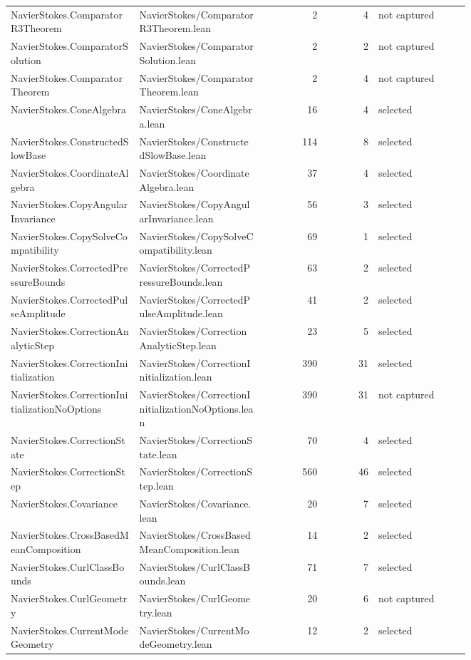 \documentclass[10pt]{article}
\begin{document}
\begin{longtable}{p{0.28\linewidth}p{0.27\linewidth}r r p{0.20\linewidth}}
NavierStokes.ComparatorR3Theorem & NavierStokes/ComparatorR3Theorem.lean & 2 & 4 & not captured\\
NavierStokes.ComparatorSolution & NavierStokes/ComparatorSolution.lean & 2 & 2 & not captured\\
NavierStokes.ComparatorTheorem & NavierStokes/ComparatorTheorem.lean & 2 & 4 & not captured\\
NavierStokes.ConeAlgebra & NavierStokes/ConeAlgebra.lean & 16 & 4 & selected\\
NavierStokes.ConstructedSlowBase & NavierStokes/ConstructedSlowBase.lean & 114 & 8 & selected\\
NavierStokes.CoordinateAlgebra & NavierStokes/CoordinateAlgebra.lean & 37 & 4 & selected\\
NavierStokes.CopyAngularInvariance & NavierStokes/CopyAngularInvariance.lean & 56 & 3 & selected\\
NavierStokes.CopySolveCompatibility & NavierStokes/CopySolveCompatibility.lean & 69 & 1 & selected\\
NavierStokes.CorrectedPressureBounds & NavierStokes/CorrectedPressureBounds.lean & 63 & 2 & selected\\
NavierStokes.CorrectedPulseAmplitude & NavierStokes/CorrectedPulseAmplitude.lean & 41 & 2 & selected\\
NavierStokes.CorrectionAnalyticStep & NavierStokes/CorrectionAnalyticStep.lean & 23 & 5 & selected\\
NavierStokes.CorrectionInitialization & NavierStokes/CorrectionInitialization.lean & 390 & 31 & selected\\
NavierStokes.CorrectionInitializationNoOptions & NavierStokes/CorrectionInitializationNoOptions.lean & 390 & 31 & not captured\\
NavierStokes.CorrectionState & NavierStokes/CorrectionState.lean & 70 & 4 & selected\\
NavierStokes.CorrectionStep & NavierStokes/CorrectionStep.lean & 560 & 46 & selected\\
NavierStokes.Covariance & NavierStokes/Covariance.lean & 20 & 7 & selected\\
NavierStokes.CrossBasedMeanComposition & NavierStokes/CrossBasedMeanComposition.lean & 14 & 2 & selected\\
NavierStokes.CurlClassBounds & NavierStokes/CurlClassBounds.lean & 71 & 7 & selected\\
NavierStokes.CurlGeometry & NavierStokes/CurlGeometry.lean & 20 & 6 & not captured\\
NavierStokes.CurrentModeGeometry & NavierStokes/CurrentModeGeometry.lean & 12 & 2 & selected\\

\end{longtable}
\end{document}
